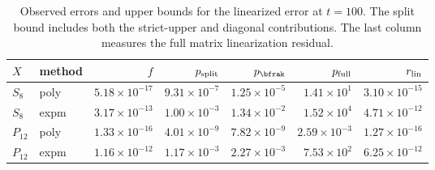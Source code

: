\begin{table}[tb]
\caption{Observed errors and upper bounds for the linearized error at $t=100$.
The split bound includes both the strict-upper and diagonal contributions.
The last column measures the full matrix linearization residual.}
\label{tab:backwardcomparison}
\centering\scriptsize
\setlength{\tabcolsep}{3pt}
\begin{tabular}{llrrrrr}
$X$ & method & $f$ & $p_{\rm split}$ & $p_{\bfrak}$ & $p_{\rm full}$ & $r_{\rm lin}$ \\
\hline
$S_8$ & poly & $5.18\times10^{-17}$ & $9.31\times10^{-7}$ & $1.25\times10^{-5}$ & $1.41\times10^{1}$ & $3.10\times10^{-15}$ \\
$S_8$ & expm & $3.17\times10^{-13}$ & $1.00\times10^{-3}$ & $1.34\times10^{-2}$ & $1.52\times10^{4}$ & $4.71\times10^{-12}$ \\
$P_{12}$ & poly & $1.33\times10^{-16}$ & $4.01\times10^{-9}$ & $7.82\times10^{-9}$ & $2.59\times10^{-3}$ & $1.27\times10^{-16}$ \\
$P_{12}$ & expm & $1.16\times10^{-12}$ & $1.17\times10^{-3}$ & $2.27\times10^{-3}$ & $7.53\times10^{2}$ & $6.25\times10^{-12}$ \\
\end{tabular}
\end{table}
